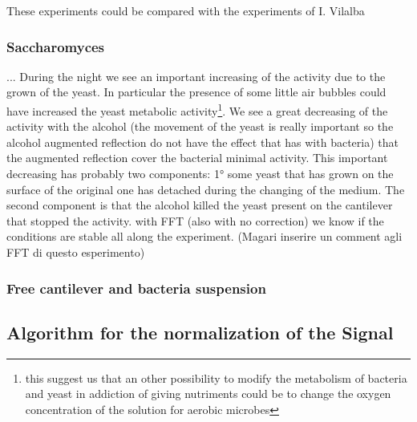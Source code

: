 \documentclass[11pt, a4paper]{article}
\begin{document}
These experiments could be compared with the experiments of I. Vilalba 
	
    
    \subsubsection{Saccharomyces}%
    ...
    During the night we see an important increasing of the activity due to the grown of the yeast. In particular the presence of some little air bubbles could have increased the yeast metabolic activity\footnote{this suggest us that an other possibility to modify the metabolism of bacteria and yeast in addiction of giving nutriments could be to change the oxygen concentration of the solution for aerobic microbes}.
We see a great decreasing of the activity with the alcohol (the movement of the yeast is really important so the alcohol augmented reflection do not have the effect that has with bacteria) that the augmented reflection cover the bacterial minimal activity. This important decreasing has probably two components: 1° some yeast that has grown on the surface of the original one has detached during the changing of the medium. The second component is that the alcohol killed the yeast present on the cantilever that stopped the activity. 
with FFT (also with no correction) we know if the conditions are stable all along the experiment.  (Magari inserire un comment agli FFT di questo esperimento)


\subsubsection{Free cantilever and bacteria suspension} %
   


\subsection{Algorithm for the normalization of the Signal}%



\end{document}
